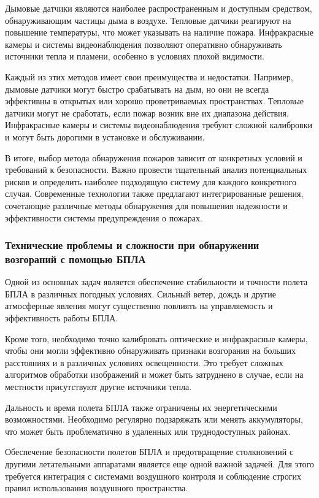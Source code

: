 Дымовые датчики являются наиболее распространенным и доступным средством, обнаруживающим частицы дыма в воздухе. Тепловые датчики реагируют на повышение температуры, что может указывать на наличие пожара. Инфракрасные камеры и системы видеонаблюдения позволяют оперативно обнаруживать источники тепла и пламени, особенно в условиях плохой видимости.

Каждый из этих методов имеет свои преимущества и недостатки. Например, дымовые датчики могут быстро срабатывать на дым, но они не всегда эффективны в открытых или хорошо проветриваемых пространствах. Тепловые датчики могут не сработать, если пожар возник вне их диапазона действия. Инфракрасные камеры и системы видеонаблюдения требуют сложной калибровки и могут быть дорогими в установке и обслуживании.

В итоге, выбор метода обнаружения пожаров зависит от конкретных условий и требований к безопасности. Важно провести тщательный анализ потенциальных рисков и определить наиболее подходящую систему для каждого конкретного случая. Современные технологии также предлагают интегрированные решения, сочетающие различные методы обнаружения для повышения надежности и эффективности системы предупреждения о пожарах.
\subsubsection{Технические проблемы и сложности при обнаружении возгораний с помощью БПЛА}
Одной из основных задач является обеспечение стабильности и точности полета БПЛА в различных погодных условиях. Сильный ветер, дождь и другие атмосферные явления могут существенно повлиять на управляемость и эффективность работы БПЛА.

Кроме того, необходимо точно калибровать оптические и инфракрасные камеры, чтобы они могли эффективно обнаруживать признаки возгорания на больших расстояниях и в различных условиях освещенности. Это требует сложных алгоритмов обработки изображений и может быть затруднено в случае, если на местности присутствуют другие источники тепла.

Дальность и время полета БПЛА также ограничены их энергетическими возможностями. Необходимо регулярно подзаряжать или менять аккумуляторы, что может быть проблематично в удаленных или труднодоступных районах.

Обеспечение безопасности полетов БПЛА и предотвращение столкновений с другими летательными аппаратами является еще одной важной задачей. Для этого требуется интеграция с системами воздушного контроля и соблюдение строгих правил использования воздушного пространства.

